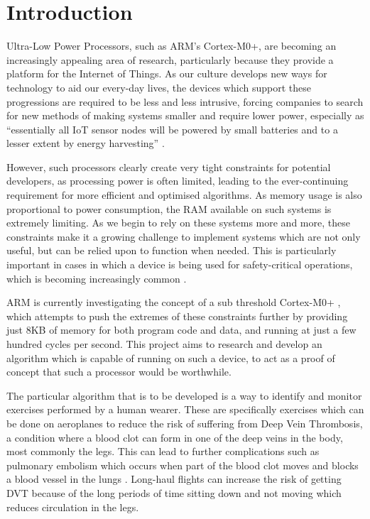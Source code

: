 \chapter{Introduction}

Ultra-Low Power Processors, such as ARM's Cortex-M0+, are becoming an increasingly appealing area of research, particularly because they provide a platform for the Internet of Things. As our culture develops new ways for technology to aid our every-day lives, the devices which support these progressions are required to be less and less intrusive, forcing companies to search for new methods of making systems smaller and require lower power, especially as ``essentially all IoT sensor nodes will be powered by small batteries and to a lesser extent by energy harvesting'' \cite{iot_power}.

However, such processors clearly create very tight constraints for potential developers, as processing power is often limited, leading to the ever-continuing requirement for more efficient and optimised algorithms. As memory usage is also proportional to power consumption, the RAM available on such systems is extremely limiting. As we begin to rely on these systems more and more, these constraints make it a growing challenge to implement systems which are not only useful, but can be relied upon to function when needed. This is particularly important in cases in which a device is being used for safety-critical operations, which is becoming increasingly common \cite{iot_saftey} \cite{iot_saftey2}.

ARM is currently investigating the concept of a sub threshold Cortex-M0+ \cite{arm_sub}, which attempts to push the extremes of these constraints further by providing just 8KB of memory for both program code and data, and running at just a few hundred cycles per second. This project aims to research and develop an algorithm which is capable of running on such a device, to act as a proof of concept that such a processor would be worthwhile.


The particular algorithm that is to be developed is a way to identify and monitor exercises performed by a human wearer. These are specifically exercises which can be done on aeroplanes to reduce the risk of suffering from Deep Vein Thrombosis, a condition where a blood clot can form in one of the deep veins in the body, most commonly the legs. This can lead to further complications such as pulmonary embolism which occurs when part of the blood clot moves and blocks a blood vessel in the lungs \cite{dvt}. Long-haul flights can increase the risk of getting DVT because of the long periods of time sitting down and not moving which reduces circulation in the legs.

